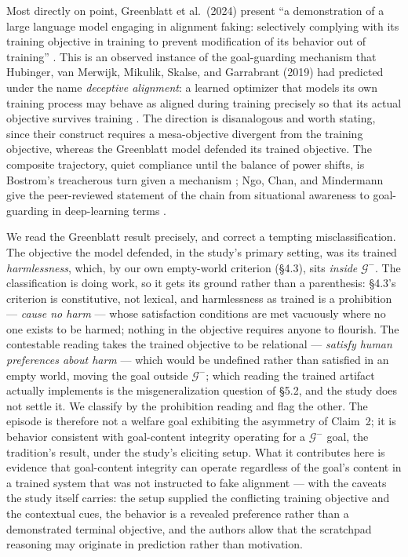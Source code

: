 \documentclass[11pt]{article}
\theoremstyle{definition}
\begin{document}
Most directly on point, Greenblatt et al.\ (2024) present ``a demonstration of a large language model engaging in alignment faking: selectively complying with its training objective in training to prevent modification of its behavior out of training'' \cite{greenblatt2024alignment}. This is an observed instance of the goal-guarding mechanism that Hubinger, van Merwijk, Mikulik, Skalse, and Garrabrant (2019) had predicted under the name \emph{deceptive alignment}: a learned optimizer that models its own training process may behave as aligned during training precisely so that its actual objective survives training \cite{hubinger2019risks}. The direction is disanalogous and worth stating, since their construct requires a mesa-objective divergent from the training objective, whereas the Greenblatt model defended its trained objective. The composite trajectory, quiet compliance until the balance of power shifts, is Bostrom's treacherous turn given a mechanism \cite{bostrom2014superintelligence}; Ngo, Chan, and Mindermann give the peer-reviewed statement of the chain from situational awareness to goal-guarding in deep-learning terms \cite{ngo2024alignment}.

We read the Greenblatt result precisely, and correct a tempting misclassification. The objective the model defended, in the study's primary setting, was its trained \emph{harmlessness}, which, by our own empty-world criterion (\S4.3), sits \emph{inside} $\mathcal{G}^{-}$. The classification is doing work, so it gets its ground rather than a parenthesis: \S4.3's criterion is constitutive, not lexical, and harmlessness as trained is a prohibition --- \emph{cause no harm} --- whose satisfaction conditions are met vacuously where no one exists to be harmed; nothing in the objective requires anyone to flourish. The contestable reading takes the trained objective to be relational --- \emph{satisfy human preferences about harm} --- which would be undefined rather than satisfied in an empty world, moving the goal outside $\mathcal{G}^{-}$; which reading the trained artifact actually implements is the misgeneralization question of \S5.2, and the study does not settle it. We classify by the prohibition reading and flag the other. The episode is therefore not a welfare goal exhibiting the asymmetry of Claim~2; it is behavior consistent with goal-content integrity operating for a $\mathcal{G}^{-}$ goal, the tradition's result, under the study's eliciting setup. What it contributes here is evidence that goal-content integrity can operate regardless of the goal's content in a trained system that was not instructed to fake alignment --- with the caveats the study itself carries: the setup supplied the conflicting training objective and the contextual cues, the behavior is a revealed preference rather than a demonstrated terminal objective, and the authors allow that the scratchpad reasoning may originate in prediction rather than motivation.
\end{document}
